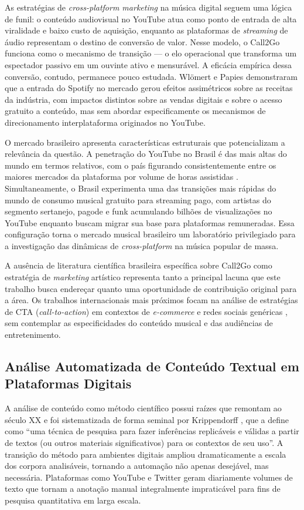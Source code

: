 \documentclass[12pt, a4paper]{article}
\begin{document}
As estratégias de \textit{cross-platform marketing} na música digital seguem uma lógica de funil: o conteúdo audiovisual no YouTube atua como ponto de entrada de alta viralidade e baixo custo de aquisição, enquanto as plataformas de \textit{streaming} de áudio representam o destino de conversão de valor. Nesse modelo, o Call2Go funciona como o mecanismo de transição --- o elo operacional que transforma um espectador passivo em um ouvinte ativo e mensurável. A eficácia empírica dessa conversão, contudo, permanece pouco estudada. Wlömert e Papies \cite{wlomert2016} demonstraram que a entrada do Spotify no mercado gerou efeitos assimétricos sobre as receitas da indústria, com impactos distintos sobre as vendas digitais e sobre o acesso gratuito a conteúdo, mas sem abordar especificamente os mecanismos de direcionamento interplataforma originados no YouTube.

O mercado brasileiro apresenta características estruturais que potencializam a relevância da questão. A penetração do YouTube no Brasil é das mais altas do mundo em termos relativos, com o país figurando consistentemente entre os maiores mercados da plataforma por volume de horas assistidas \cite{ifpi2023}. Simultaneamente, o Brasil experimenta uma das transições mais rápidas do mundo de consumo musical gratuito para streaming pago, com artistas do segmento sertanejo, pagode e funk acumulando bilhões de visualizações no YouTube enquanto buscam migrar sua base para plataformas remuneradas. Essa configuração torna o mercado musical brasileiro um laboratório privilegiado para a investigação das dinâmicas de \textit{cross-platform} na música popular de massa.

A ausência de literatura científica brasileira específica sobre Call2Go como estratégia de \textit{marketing} artístico representa tanto a principal lacuna que este trabalho busca endereçar quanto uma oportunidade de contribuição original para a área. Os trabalhos internacionais mais próximos focam na análise de estratégias de CTA (\textit{call-to-action}) em contextos de \textit{e-commerce} e redes sociais genéricas \cite{napoli2012}, sem contemplar as especificidades do conteúdo musical e das audiências de entretenimento.

\subsection{Análise Automatizada de Conteúdo Textual em Plataformas Digitais}

A análise de conteúdo como método científico possui raízes que remontam ao século XX e foi sistematizada de forma seminal por Krippendorff \cite{krippendorff2004}, que a define como ``uma técnica de pesquisa para fazer inferências replicáveis e válidas a partir de textos (ou outros materiais significativos) para os contextos de seu uso''. A transição do método para ambientes digitais ampliou dramaticamente a escala dos corpora analisáveis, tornando a automação não apenas desejável, mas necessária. Plataformas como YouTube e Twitter geram diariamente volumes de texto que tornam a anotação manual integralmente impraticável para fins de pesquisa quantitativa em larga escala.
\end{document}
